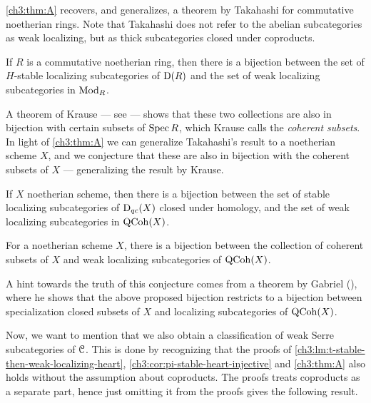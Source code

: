 \cref{ch3:thm:A} recovers, and generalizes, a theorem by Takahashi for commutative noetherian rings. Note that Takahashi does not refer to the abelian subcategories as weak localizing, but as thick subcategories closed under coproducts. 

\begin{corollary}
    \label{ch3:cor:takahashi-weak-localizing}
    If $R$ is a commutative noetherian ring, then there is a bijection between the set of $H$-stable localizing subcategories of $\mathrm{D}(R)$ and the set of weak localizing subcategories in $\mathrm{Mod}_R$. 
\end{corollary}

A theorem of Krause --- see \cite[3.1]{krause_2008} --- shows that these two collections are also in bijection with certain subsets of $\operatorname{Spec} R$, which Krause calls the \emph{coherent subsets}. In light of \cref{ch3:thm:A} we can generalize Takahashi's result to a noetherian scheme $X$, and we conjecture that these are also in bijection with the coherent subsets of $X$ --- generalizing the result by Krause.  

\begin{corollary}
    \label{ch3:cor:noetherian-scheme-weak-localizing}
    If $X$ noetherian scheme, then there is a bijection between the set of stable localizing subcategories of $\mathrm{D}_{qc}(X)$ closed under homology, and the set of weak localizing subcategories in $\operatorname{QCoh}(X)$. 
\end{corollary}

\begin{conjecture}
    \label{ch3:conj:coherent-noetherian-scheme}
    For a noetherian scheme $X$, there is a bijection between the collection of coherent subsets of $X$ and weak localizing subcategories of $\operatorname{QCoh}(X)$. 
\end{conjecture}

\begin{remark}
    A hint towards the truth of this conjecture comes from a theorem by Gabriel (\cite[VI.2.4(b)]{gabriel_1962}), where he shows that the above proposed bijection restricts to a bijection between specialization closed subsets of $X$ and localizing subcategories of $\operatorname{QCoh}(X)$. 
\end{remark}

Now, we want to mention that we also obtain a classification of weak Serre subcategories of $\EuScript{C}$. This is done by recognizing that the proofs of \cref{ch3:lm:t-stable-then-weak-localizing-heart}, \cref{ch3:cor:pi-stable-heart-injective} and \cref{ch3:thm:A} also holds without the assumption about coproducts. The proofs treats coproducts as a separate part, hence just omitting it from the proofs gives the following result. 

